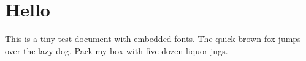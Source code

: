 \documentclass[11pt]{article}
\begin{document}
\section*{Hello}
This is a tiny test document with embedded fonts.
The quick brown fox jumps over the lazy dog.
Pack my box with five dozen liquor jugs.
\end{document}
